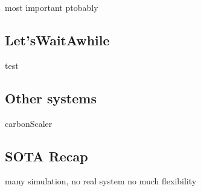 most important ptobably

\subsection{Let'sWaitAwhile}

test

\subsection{Other systems}

carbonScaler




\subsection{SOTA Recap}

many simulation, no real system
no much flexibility


\newpage
